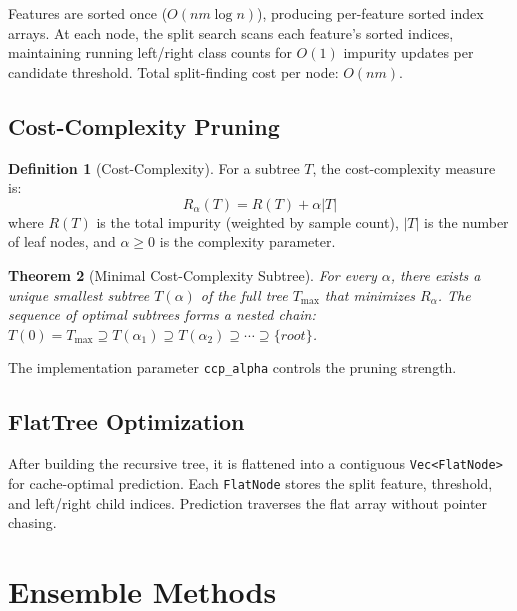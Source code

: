 \documentclass[11pt,a4paper]{article}
\newtheorem{theorem}{Theorem}[section]
\theoremstyle{definition}
\newtheorem{definition}[theorem]{Definition}
\theoremstyle{remark}
\begin{document}
Features are sorted once ($O(nm\log n)$), producing per-feature sorted index arrays. At each node, the split search scans each feature's sorted indices, maintaining running left/right class counts for $O(1)$ impurity updates per candidate threshold. Total split-finding cost per node: $O(nm)$.

\subsection{Cost-Complexity Pruning}

\begin{definition}[Cost-Complexity]
For a subtree $T$, the cost-complexity measure is:
\begin{equation}
R_\alpha(T) = R(T) + \alpha|T|
\end{equation}
where $R(T)$ is the total impurity (weighted by sample count), $|T|$ is the number of leaf nodes, and $\alpha \geq 0$ is the complexity parameter.
\end{definition}

\begin{theorem}[Minimal Cost-Complexity Subtree]
For every $\alpha$, there exists a unique smallest subtree $T(\alpha)$ of the full tree $T_{\max}$ that minimizes $R_\alpha$. The sequence of optimal subtrees forms a nested chain: $T(0) = T_{\max} \supseteq T(\alpha_1) \supseteq T(\alpha_2) \supseteq \cdots \supseteq \{root\}$.
\end{theorem}

The implementation parameter \texttt{ccp\_alpha} controls the pruning strength.

\subsection{FlatTree Optimization}

After building the recursive tree, it is flattened into a contiguous \texttt{Vec<FlatNode>} for cache-optimal prediction. Each \texttt{FlatNode} stores the split feature, threshold, and left/right child indices. Prediction traverses the flat array without pointer chasing.


\section{Ensemble Methods}
\end{document}
